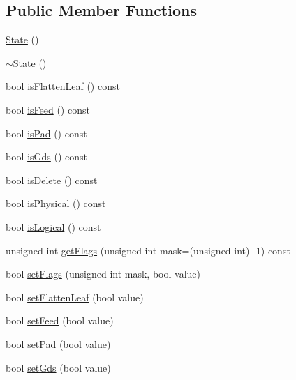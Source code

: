 \subsection*{Public Member Functions}
\begin{DoxyCompactItemize}
\item 
\mbox{\hyperlink{classCRL_1_1Catalog_1_1State_a97e69ca85c09942e20d41013b8ff5280}{State}} ()
\item 
\mbox{\hyperlink{classCRL_1_1Catalog_1_1State_ae25003eae8262a994fba979f28c35aed}{$\sim$\+State}} ()
\item 
bool \mbox{\hyperlink{classCRL_1_1Catalog_1_1State_a14f0d3b8c2e62ad51c78cb8cac4ebbf6}{is\+Flatten\+Leaf}} () const
\item 
bool \mbox{\hyperlink{classCRL_1_1Catalog_1_1State_a53c89121d49a7fc9f8a09093a35d32c4}{is\+Feed}} () const
\item 
bool \mbox{\hyperlink{classCRL_1_1Catalog_1_1State_a457e8dcf1928e6df40ec9f686350c2d0}{is\+Pad}} () const
\item 
bool \mbox{\hyperlink{classCRL_1_1Catalog_1_1State_a7af8d732bf9cea0b0ddb4eca3b0528ec}{is\+Gds}} () const
\item 
bool \mbox{\hyperlink{classCRL_1_1Catalog_1_1State_ac6df038ecb133b973f9b9f2a5e858ca5}{is\+Delete}} () const
\item 
bool \mbox{\hyperlink{classCRL_1_1Catalog_1_1State_a72b60d86f25221fd8fe7a5902be528a2}{is\+Physical}} () const
\item 
bool \mbox{\hyperlink{classCRL_1_1Catalog_1_1State_a07aad28830a57090cf9203b0ff8714b1}{is\+Logical}} () const
\item 
unsigned int \mbox{\hyperlink{classCRL_1_1Catalog_1_1State_a80ac3efddd043ec7151680755cc3db42}{get\+Flags}} (unsigned int mask=(unsigned int) -\/1) const
\item 
bool \mbox{\hyperlink{classCRL_1_1Catalog_1_1State_a73a3866e9da359611638b2d725a79613}{set\+Flags}} (unsigned int mask, bool value)
\item 
bool \mbox{\hyperlink{classCRL_1_1Catalog_1_1State_a4fba9a5ea27f5a36e41f0246124a3095}{set\+Flatten\+Leaf}} (bool value)
\item 
bool \mbox{\hyperlink{classCRL_1_1Catalog_1_1State_ab5936e80369947177be88c3d770f4725}{set\+Feed}} (bool value)
\item 
bool \mbox{\hyperlink{classCRL_1_1Catalog_1_1State_a97e2158809ed0e88237bb92eb8daa290}{set\+Pad}} (bool value)
\item 
bool \mbox{\hyperlink{classCRL_1_1Catalog_1_1State_acc0c819f382393dc780bb19c7788b216}{set\+Gds}} (bool value)

\end{DoxyCompactItemize}
